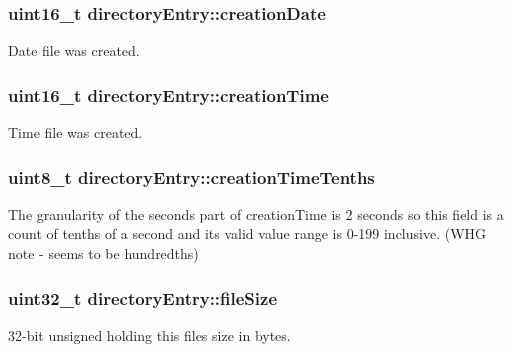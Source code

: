 \subsubsection[{\texorpdfstring{creation\+Date}{creationDate}}]{\setlength{\rightskip}{0pt plus 5cm}uint16\+\_\+t directory\+Entry\+::creation\+Date}\hypertarget{structdirectory_entry_a7b43372794655fe6604d3c17c02302fe}{}\label{structdirectory_entry_a7b43372794655fe6604d3c17c02302fe}
Date file was created. 
\subsubsection[{\texorpdfstring{creation\+Time}{creationTime}}]{\setlength{\rightskip}{0pt plus 5cm}uint16\+\_\+t directory\+Entry\+::creation\+Time}\hypertarget{structdirectory_entry_a622bfa70c2cd9006108d7473d737a953}{}\label{structdirectory_entry_a622bfa70c2cd9006108d7473d737a953}
Time file was created. 
\subsubsection[{\texorpdfstring{creation\+Time\+Tenths}{creationTimeTenths}}]{\setlength{\rightskip}{0pt plus 5cm}uint8\+\_\+t directory\+Entry\+::creation\+Time\+Tenths}\hypertarget{structdirectory_entry_aa5e1ce5b411b88f005b28a3e7c7c5af6}{}\label{structdirectory_entry_aa5e1ce5b411b88f005b28a3e7c7c5af6}
The granularity of the seconds part of creation\+Time is 2 seconds so this field is a count of tenths of a second and its valid value range is 0-\/199 inclusive. (W\+HG note -\/ seems to be hundredths) 
\subsubsection[{\texorpdfstring{file\+Size}{fileSize}}]{\setlength{\rightskip}{0pt plus 5cm}uint32\+\_\+t directory\+Entry\+::file\+Size}\hypertarget{structdirectory_entry_ac2445d99b50f925f662952e0ccd26a02}{}\label{structdirectory_entry_ac2445d99b50f925f662952e0ccd26a02}
32-\/bit unsigned holding this file\textquotesingle{}s size in bytes. 
